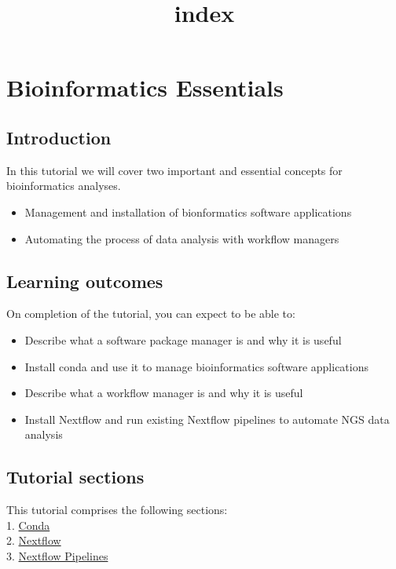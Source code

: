 \documentclass[11pt]{article}
\title{index}
\providecommand{\tightlist}{%
      \setlength{\itemsep}{0pt}\setlength{\parskip}{0pt}}
\begin{document}
    \hypertarget{bioinformatics-essentials}{%
\section{Bioinformatics Essentials}\label{bioinformatics-essentials}}

\hypertarget{introduction}{%
\subsection{Introduction}\label{introduction}}

In this tutorial we will cover two important and essential concepts for
bioinformatics analyses.

\begin{itemize}
\tightlist
\item
  Management and installation of bionformatics software applications
\item
  Automating the process of data analysis with workflow managers
\end{itemize}

\hypertarget{learning-outcomes}{%
\subsection{Learning outcomes}\label{learning-outcomes}}

On completion of the tutorial, you can expect to be able to:

\begin{itemize}
\tightlist
\item
  Describe what a software package manager is and why it is useful
\item
  Install conda and use it to manage bioinformatics software
  applications
\item
  Describe what a workflow manager is and why it is useful
\item
  Install Nextflow and run existing Nextflow pipelines to automate NGS
  data analysis
\end{itemize}

\hypertarget{tutorial-sections}{%
\subsection{Tutorial sections}\label{tutorial-sections}}

This tutorial comprises the following sections:\\
1. \href{conda.ipynb}{Conda}\\
2. \href{nextflow.ipynb}{Nextflow}\\
3. \href{nf_pipelines.ipynb}{Nextflow Pipelines}
\end{document}
